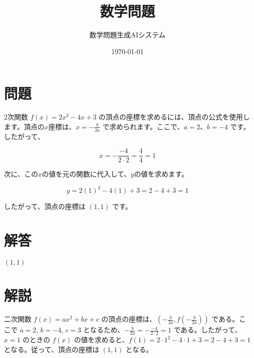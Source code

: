 \documentclass[a4paper,11pt]{article}
\title{数学問題}
\author{数学問題生成AIシステム}
\date{\today}
\numberwithin{equation}{section}
\theoremstyle{definition}
\theoremstyle{remark}
\begin{document}
\maketitle

\section*{問題}

2次関数 $f(x) = 2x^2 - 4x + 3$ の頂点の座標を求めるには、頂点の公式を使用します。頂点の$x$座標は、$x = -\frac{b}{2a}$ で求められます。ここで、$a = 2$、$b = -4$ です。したがって、

\[x = -\frac{-4}{2 \cdot 2} = \frac{4}{4} = 1\]

次に、この$x$の値を元の関数に代入して、$y$の値を求めます。

\[y = 2(1)^2 - 4(1) + 3 = 2 - 4 + 3 = 1\]

したがって、頂点の座標は $(1, 1)$ です。


\section*{解答}

$(1, 1)$

\section*{解説}

二次関数 $f(x) = ax^2 + bx + c$ の頂点の座標は、$\left(-\frac{b}{2a}, f\left(-\frac{b}{2a}\right)\right)$ である。ここで $a = 2$, $b = -4$, $c = 3$ となるため、$-\frac{b}{2a} = -\frac{-4}{2\cdot2} = 1$ である。したがって、$x = 1$ のときの $f(x)$ の値を求めると、$f(1) = 2\cdot1^2 - 4\cdot1 + 3 = 2 - 4 + 3 = 1$ となる。従って、頂点の座標は $(1, 1)$ となる。
\end{document}
